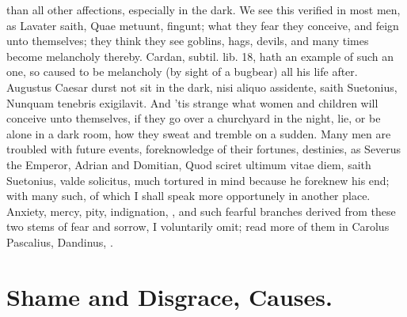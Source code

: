 {than all other affections, especially in the dark. We see this verified
in most men, as Lavater saith, Quae metuunt, fingunt; what they
fear they conceive, and feign unto themselves; they think they see
goblins, hags, devils, and many times become melancholy thereby.
Cardan, subtil. lib. 18, hath an example of such an one, so caused to
be melancholy (by sight of a bugbear) all his life after. Augustus
Caesar durst not sit in the dark, nisi aliquo assidente, saith
Suetonius, Nunquam tenebris exigilavit. And 'tis strange what
women and children will conceive unto themselves, if they go over a
churchyard in the night, lie, or be alone in a dark room, how they
sweat and tremble on a sudden. Many men are troubled with future
events, foreknowledge of their fortunes, destinies, as Severus the
Emperor, Adrian and Domitian, Quod sciret ultimum vitae diem, saith
Suetonius, valde solicitus, much tortured in mind because he foreknew
his end; with many such, of which I shall speak more opportunely in
another place. Anxiety, mercy, pity, indignation, \etc{}, and such
fearful branches derived from these two stems of fear and sorrow, I
voluntarily omit; read more of them in Carolus Pascalius,
Dandinus, \etc{}.

\section{Shame and Disgrace, Causes.}

}
